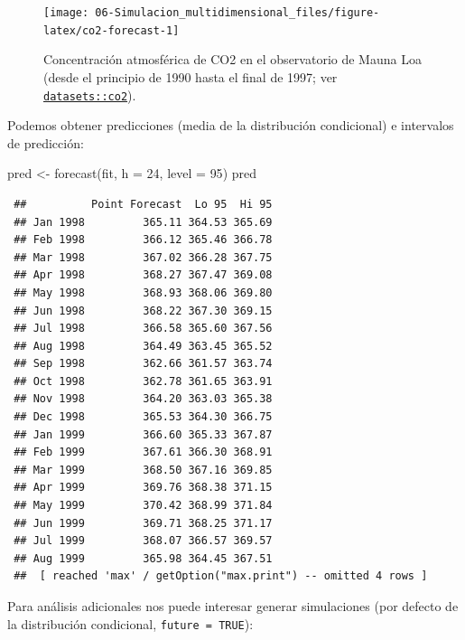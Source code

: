 \documentclass[
  10pt,
]{book}
\newenvironment{Shaded}{\begin{snugshade}}{\end{snugshade}}
\newcommand{\AttributeTok}[1]{\textcolor[rgb]{0.77,0.63,0.00}{#1}}
\newcommand{\DecValTok}[1]{\textcolor[rgb]{0.00,0.00,0.81}{#1}}
\newcommand{\FunctionTok}[1]{\textcolor[rgb]{0.00,0.00,0.00}{#1}}
\newcommand{\NormalTok}[1]{#1}
\newcommand{\OtherTok}[1]{\textcolor[rgb]{0.56,0.35,0.01}{#1}}
\theoremstyle{break}
\theoremstyle{nonumberplain}
\begin{document}
\begin{figure}[!htbp]

{\centering \texttt{[image: 06-Simulacion\_multidimensional\_files/figure-latex/co2-forecast-1]} 

}

\caption{Concentración atmosférica de CO2 en el observatorio de Mauna Loa (desde el principio de 1990 hasta el final de 1997; ver \href{https://rdrr.io/r/datasets/co2.html}{\texttt{datasets::co2}}).}\label{fig:co2-forecast}
\end{figure}

Podemos obtener predicciones (media de la distribución condicional) e intervalos de predicción:

\begin{Shaded}
\begin{Highlighting}[]
\NormalTok{pred }\OtherTok{\textless{}{-}} \FunctionTok{forecast}\NormalTok{(fit, }\AttributeTok{h =} \DecValTok{24}\NormalTok{, }\AttributeTok{level =} \DecValTok{95}\NormalTok{)}
\NormalTok{pred}
\end{Highlighting}
\end{Shaded}

\begin{verbatim}
 ##          Point Forecast  Lo 95  Hi 95
 ## Jan 1998         365.11 364.53 365.69
 ## Feb 1998         366.12 365.46 366.78
 ## Mar 1998         367.02 366.28 367.75
 ## Apr 1998         368.27 367.47 369.08
 ## May 1998         368.93 368.06 369.80
 ## Jun 1998         368.22 367.30 369.15
 ## Jul 1998         366.58 365.60 367.56
 ## Aug 1998         364.49 363.45 365.52
 ## Sep 1998         362.66 361.57 363.74
 ## Oct 1998         362.78 361.65 363.91
 ## Nov 1998         364.20 363.03 365.38
 ## Dec 1998         365.53 364.30 366.75
 ## Jan 1999         366.60 365.33 367.87
 ## Feb 1999         367.61 366.30 368.91
 ## Mar 1999         368.50 367.16 369.85
 ## Apr 1999         369.76 368.38 371.15
 ## May 1999         370.42 368.99 371.84
 ## Jun 1999         369.71 368.25 371.17
 ## Jul 1999         368.07 366.57 369.57
 ## Aug 1999         365.98 364.45 367.51
 ##  [ reached 'max' / getOption("max.print") -- omitted 4 rows ]
\end{verbatim}

Para análisis adicionales nos puede interesar generar simulaciones (por defecto de la distribución condicional, \texttt{future\ =\ TRUE}):
\end{document}

